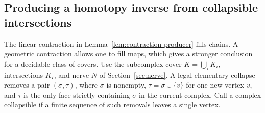 \subsection{Producing a homotopy inverse from collapsible intersections}
\label{sec:collapse-nerve}

The linear contraction in Lemma~\ref{lem:contraction-producer} fills
chains. A geometric contraction allows one to fill maps, which gives a
stronger conclusion for a decidable class of covers. Use the subcomplex
cover $K=\bigcup_i K_i$, intersections $K_I$, and nerve $N$ of
Section~\ref{sec:nerve}. A legal elementary collapse removes a pair
$(\sigma,\tau)$, where $\sigma$ is nonempty, $\tau=\sigma\cup\{v\}$
for one new vertex $v$, and $\tau$ is the only face strictly containing
$\sigma$ in the current complex. Call a complex collapsible if a finite
sequence of such removals leaves a single vertex.

